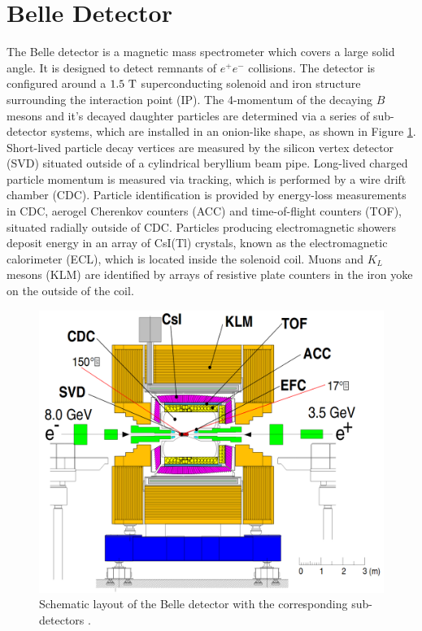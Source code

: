 \section{Belle Detector}
The Belle detector is a magnetic mass spectrometer which covers a large solid angle. It is designed to detect remnants of $e^+e^-$ collisions. The detector is configured around a $1.5\mathrm{~T}$ superconducting solenoid and iron structure surrounding the interaction point (IP). The 4-momentum of the decaying $B$ mesons and it's decayed daughter particles are determined via a series of sub-detector systems, which are installed in an onion-like shape, as shown in Figure \ref{fig:bdet}. Short-lived particle decay vertices are measured by the silicon vertex detector (SVD) situated outside of a cylindrical beryllium beam pipe. Long-lived charged particle momentum is measured via tracking, which is performed by a wire drift chamber (CDC). Particle identification is provided by energy-loss measurements in CDC, aerogel Cherenkov counters (ACC) and time-of-flight counters (TOF), situated radially outside of CDC. Particles producing electromagnetic showers deposit energy in an array of CsI(Tl) crystals, known as the electromagnetic calorimeter (ECL), which is located inside the solenoid coil. Muons and $K_L$ mesons (KLM) are identified by arrays of resistive plate counters in the iron yoke on the outside of the coil. 

\begin{figure}[H]
	\centering
	\captionsetup{width=0.8\linewidth}
	\includegraphics[width=0.8\linewidth]{fig/setup/Belle_detector}
	\caption{Schematic layout of the Belle detector with the corresponding sub-detectors \cite{ABASHIAN2002117}.}
	\label{fig:bdet}
\end{figure}

